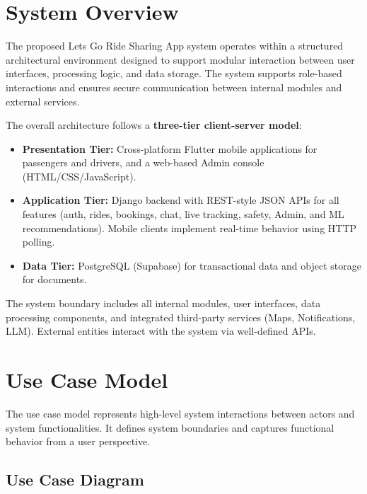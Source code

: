 \section{System Overview}

The proposed Lets Go Ride Sharing App system operates within a structured architectural environment designed to support modular interaction between user interfaces, processing logic, and data storage. The system supports role-based interactions and ensures secure communication between internal modules and external services.

The overall architecture follows a \textbf{three-tier client-server model}:
\begin{itemize}
    \item \textbf{Presentation Tier:} Cross-platform Flutter mobile applications for passengers and drivers, and a web-based Admin console (HTML/CSS/JavaScript).
    \item \textbf{Application Tier:} Django backend with REST-style JSON APIs for all features (auth, rides, bookings, chat, live tracking, safety, Admin, and ML recommendations). Mobile clients implement real-time behavior using HTTP polling.
    \item \textbf{Data Tier:} PostgreSQL (Supabase) for transactional data and object storage for documents.
\end{itemize}

The system boundary includes all internal modules, user interfaces, data processing components, and integrated third-party services (Maps, Notifications, LLM). External entities interact with the system via well-defined APIs.

\section{Use Case Model}

The use case model represents high-level system interactions between actors and system functionalities. It defines system boundaries and captures functional behavior from a user perspective.

\subsection{Use Case Diagram}

